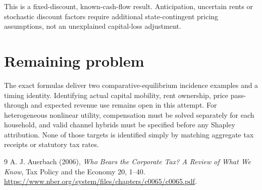\documentclass[11pt]{article}
\theoremstyle{definition}
\begin{document}
This is a fixed-discount, known-cash-flow result. Anticipation, uncertain
rents or stochastic discount factors require additional state-contingent
pricing assumptions, not an unexplained capital-loss adjustment.

\section*{Remaining problem}
The exact formulas deliver two comparative-equilibrium incidence examples
and a timing identity. Identifying actual capital mobility, rent ownership,
price pass-through and expected revenue use remains open in this attempt.
For heterogeneous nonlinear utility, compensation must be solved separately
for each household, and valid channel hybrids must be specified before any
Shapley attribution. None of those targets is identified simply by matching
aggregate tax receipts or statutory tax rates.

\begin{thebibliography}{9}
 A. J. Auerbach (2006), \emph{Who Bears the Corporate Tax?
A Review of What We Know}, Tax Policy and the Economy 20, 1--40.
\url{https://www.nber.org/system/files/chapters/c0065/c0065.pdf}.
\end{thebibliography}
\end{document}
